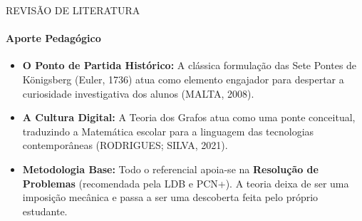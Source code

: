 \documentclass[10pt, aspectratio=169]{beamer}
\begin{document}
\begin{frame}{REVISÃO DE LITERATURA}
  \framesubtitle{Aporte Pedagógico}
  \begin{itemize}
      \item \textbf{O Ponto de Partida Histórico:} A clássica formulação das Sete Pontes de Königsberg (Euler, 1736) atua como elemento engajador para despertar a curiosidade investigativa dos alunos (MALTA, 2008).
      \vspace{0.4cm}
      
      \item \textbf{A Cultura Digital:} A Teoria dos Grafos atua como uma ponte conceitual, traduzindo a Matemática escolar para a linguagem das tecnologias contemporâneas (RODRIGUES; SILVA, 2021).
      \vspace{0.4cm}
      
      \item \textbf{Metodologia Base:} Todo o referencial apoia-se na \textbf{Resolução de Problemas} (recomendada pela LDB e PCN+). A teoria deixa de ser uma imposição mecânica e passa a ser uma descoberta feita pelo próprio estudante.
  \end{itemize}
\end{frame}
\end{document}
